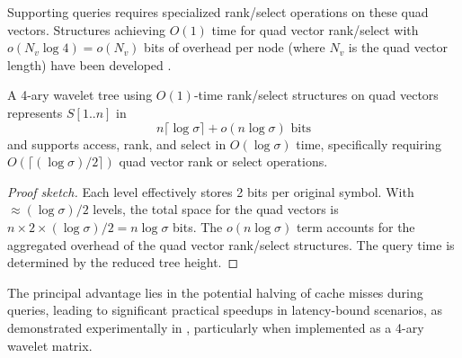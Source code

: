 Supporting queries requires specialized rank/select operations on these quad vectors. Structures achieving $O(1)$ time for quad vector rank/select with $o(N_v \log 4) = o(N_v)$ bits of overhead per node (where $N_v$ is the quad vector length) have been developed \cite{QWT}.

\begin{theorem} \label{thm:qwt_perf}
    A 4-ary wavelet tree using $O(1)$-time rank/select structures on quad vectors represents $S[1..n]$ in
    \[ n \lceil \log \sigma \rceil + o(n \log \sigma) \text{ bits} \]
    and supports \textsf{access}, \textsf{rank}, and \textsf{select} in $O(\log \sigma)$ time, specifically requiring $O(\lceil (\log \sigma)/2 \rceil)$ quad vector rank or select operations.
\end{theorem}
\begin{proof}[Proof sketch]
    Each level effectively stores 2 bits per original symbol. With $\approx (\log \sigma)/2$ levels, the total space for the quad vectors is $n \times 2 \times (\log \sigma)/2 = n \log \sigma$ bits. The $o(n \log \sigma)$ term accounts for the aggregated overhead of the quad vector rank/select structures. The query time is determined by the reduced tree height.
\end{proof}

The principal advantage lies in the potential halving of cache misses during queries, leading to significant practical speedups in latency-bound scenarios, as demonstrated experimentally in \cite{QWT}, particularly when implemented as a 4-ary wavelet matrix.
